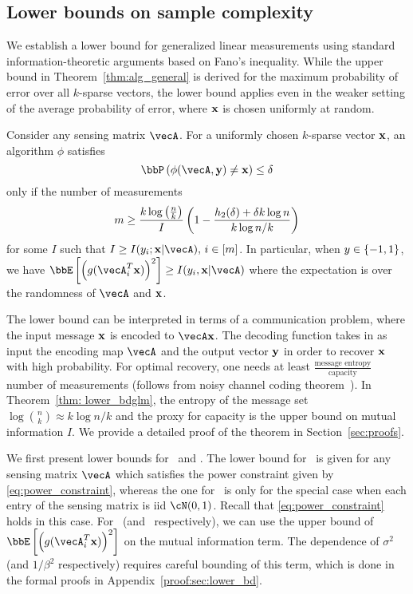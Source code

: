 \subsection{Lower bounds on sample complexity}\label{sec:sample_compexity}
We establish a lower bound for generalized linear measurements using standard information-theoretic arguments based on Fano's inequality. While the upper bound in Theorem~\ref{thm:alg_general} is derived for the maximum probability of error over all  $k$-sparse vectors, the lower bound applies even in the weaker setting of the average probability of error, where 
$\mathbf{x}$ is chosen uniformly at random.
\begin{theorem}\label{thm: lower_bdglm} Consider any  sensing matrix $\vecA$.
For a uniformly chosen $k$-sparse vector $\mathbf{x}$, an algorithm $\phi$ satisfies $$\bbP\inp{\phi(\vecA, \by) \neq \bx}\leq \delta$$   only if the number of measurements $$m\geq \frac{k\log\left(\frac{n}{k}\right)}{I}\left(1 - \frac{h_2(\delta) + \delta k\log{n}}{k\log{n/k}}\right)$$ for some $I$ such that $I\geq {I(y_i; \bx|\vecA)}, \, i\in [m]$. In particular, when $y\in \left\{-1, 1\right\}$, we have $\bbE\insq{\inp{g(\vecA_i^T\bx)}^2} \geq I(y_i, \bx|\vecA)$ where the expectation is over the randomness of $\vecA$ and $\mathbf{x}$.
\end{theorem}
The lower bound can be interpreted in terms of a communication problem, where the input message $\mathbf{x}$ is encoded to $\vecA\bx$. The decoding function takes in as input the encoding map $\vecA$ and the output vector $\mathbf{y}$ in order to recover $\mathbf{x}$ with high probability. For optimal recovery, one needs at least $\frac{\text{message entropy}}{\text{capacity}}$ number of measurements (follows from noisy channel coding theorem~\cite{thomas2006elements}). In Theorem~\ref{thm: lower_bdglm}, the entropy of the message set $\log{n \choose k}\approx k\log{n/k}$ and the proxy for capacity is the upper bound on mutual information $I$. We provide a detailed proof of the theorem in  Section~\ref{sec:proofs}.


We first present lower bounds for \bcs\  and \logreg. The lower bound for \bcs\ is given for any sensing matrix $\vecA$ which satisfies the power constraint given by \eqref{eq:power_constraint}, whereas the one for \logreg\ is only for the special case when each entry of the sensing matrix is iid $\cN(0,1)$. Recall that \eqref{eq:power_constraint} holds in this case.  For \bcs\ (and \logreg\ respectively), we can use the upper bound of $\bbE\insq{\inp{g(\vecA_i^T\bx)}^2}$ on the mutual information term. The dependence of $\sigma^2$ (and $1/\beta^2$ respectively) requires careful bounding of this term, which is done in the formal proofs in Appendix~\ref{proof:sec:lower_bd}.


